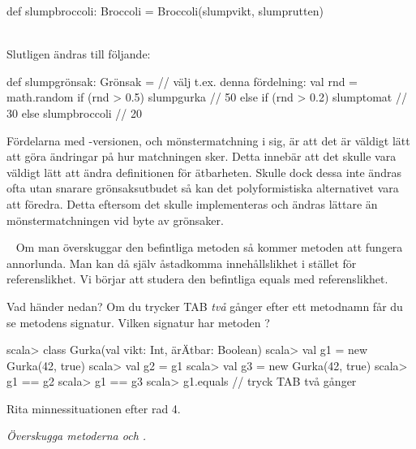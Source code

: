 \begin{Code}
def slumpbroccoli: Broccoli = Broccoli(slumpvikt, slumprutten)
\end{Code}
~\\
Slutligen ändras  till följande:

\begin{Code}
def slumpgrönsak: Grönsak = {    // välj t.ex. denna fördelning:
  val rnd = math.random
  if (rnd > 0.5) slumpgurka      // 50%
  else if (rnd > 0.2) slumptomat // 30%
  else slumpbroccoli             // 20%
}
\end{Code}

\SubtaskSolved  Fördelarna med -versionen, och mönstermatchning i sig, är att det är väldigt lätt att göra ändringar på hur matchningen sker. Detta innebär att det skulle vara väldigt lätt att ändra definitionen för ätbarheten. Skulle dock dessa inte ändras ofta utan snarare grönsaksutbudet så kan det polyformistiska alternativet vara att föredra. Detta eftersom det skulle implementeras och ändras lättare än mönstermatchningen vid byte av grönsaker.



\QUESTEND






\QUESTBEGIN

\Task  \what~   Om man överskuggar den befintliga metoden  så kommer metoden \code{==} att fungera annorlunda. Man kan då själv åstadkomma innehållslikhet i stället för referenslikhet. Vi börjar att studera den befintliga equals med referenslikhet.

\Subtask \label{subtask:refequals} Vad händer nedan? Om du trycker TAB \emph{två} gånger efter ett metodnamn får du se metodens signatur. Vilken signatur har metoden ?
\begin{REPL}
scala> class Gurka(val vikt: Int, ärÄtbar: Boolean)
scala> val g1 = new Gurka(42, true)
scala> val g2 = g1
scala> val g3 = new Gurka(42, true)
scala> g1 == g2
scala> g1 == g3
scala> g1.equals  // tryck TAB två gånger
\end{REPL}

\Subtask Rita minnessituationen efter rad 4.

\Subtask \emph{Överskugga metoderna  och .}

